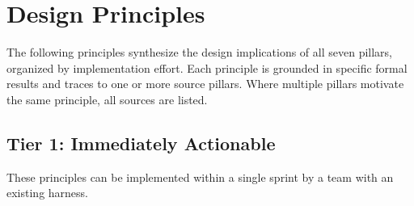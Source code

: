 \documentclass[11pt, a4paper, logo, copyright]{googledeepmind}
\begin{document}
\section{Design Principles}
\label{sec:principles}

The following principles synthesize the design implications of all seven pillars, organized by implementation effort. Each principle is grounded in specific formal results and traces to one or more source pillars. Where multiple pillars motivate the same principle, all sources are listed.

\subsection{Tier 1: Immediately Actionable}
\label{sec:tier1}

These principles can be implemented within a single sprint by a team with an existing harness.
\end{document}
